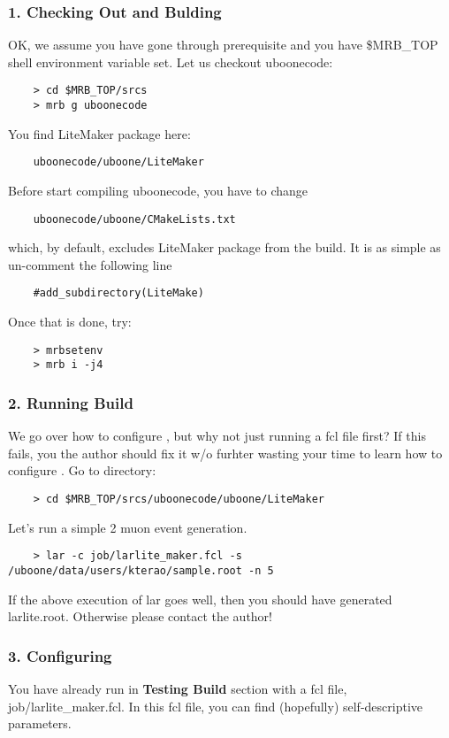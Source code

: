\subsubsection{1. Checking Out and Bulding \LiteScanner}
OK, we assume you have gone through prerequisite and you have {\ttfamily \$MRB\_TOP} shell environment variable set. 
Let us checkout {\ttfamily uboonecode}:
\begin{lstlisting}
    > cd $MRB_TOP/srcs
    > mrb g uboonecode
\end{lstlisting}
You find LiteMaker package here:
\begin{lstlisting}
    uboonecode/uboone/LiteMaker
\end{lstlisting}
Before start compiling {\ttfamily uboonecode}, you have to change
\begin{lstlisting}
    uboonecode/uboone/CMakeLists.txt
\end{lstlisting}
which, by default, excludes {\ttfamily LiteMaker} package from the build.
It is as simple as un-comment the following line
\begin{lstlisting}
    #add_subdirectory(LiteMake)
\end{lstlisting}
Once that is done, try:
\begin{lstlisting}
    > mrbsetenv
    > mrb i -j4
\end{lstlisting}

\subsubsection{2. Running \LiteScanner Build}
We go over how to configure \LiteScanner, but why not just running a fcl file first? If this fails, you the author should fix it w/o furhter wasting your time to learn how to configure \LiteScanner.
Go to \LiteScanner directory:
\begin{lstlisting}
    > cd $MRB_TOP/srcs/uboonecode/uboone/LiteMaker
\end{lstlisting}
Let's run a simple 2 muon event generation.
\begin{lstlisting}
    > lar -c job/larlite_maker.fcl -s /uboone/data/users/kterao/sample.root -n 5
\end{lstlisting}
If the above execution of {\ttfamily lar} goes well, then you should have generated {\ttfamily larlite.root}. Otherwise please contact the author! 

\subsubsection{3. Configuring \LiteScanner}
You have already run \LiteScanner in {\bf Testing \LiteScanner Build} section with a fcl file, {\ttfamily job/larlite\_maker.fcl}. In this fcl file, you can find (hopefully) self-descriptive parameters.

